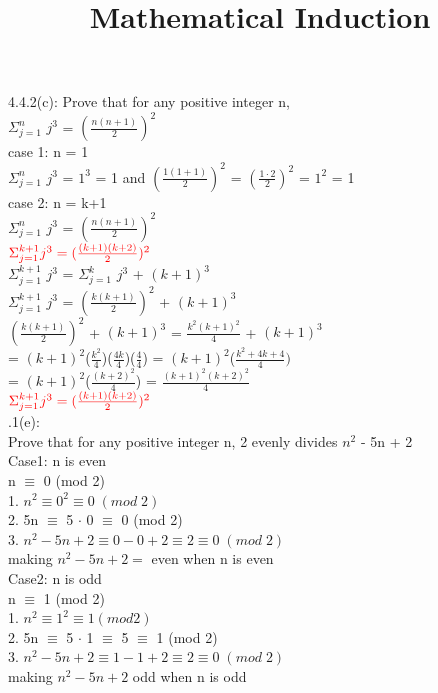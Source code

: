 \documentclass{article}
\title{Mathematical Induction}
\author{}
\date{}
\begin{document}
	4.4.2(c): 
	\newline
	Prove that for any positive integer n, \\
	$\Sigma^{n}_{j=1}$ $j^3$ = $(\frac{n(n+1)}{2})^2$ \\
	case 1: n = 1 \\
	$\Sigma^{n}_{j=1}$ $j^3$ = $1^3$ = 1
	and $(\frac{1(1+1)}{2})^2$ = $(\frac{1 \cdot 2}{2})^2$ = $1^2$ = 1 \\
	case 2: n = k+1 \\
	$\Sigma^{n}_{j=1}$ $j^3$ = $(\frac{n(n+1)}{2})^2$ \\
	$\color{red}{\Sigma^{k+1}_{j=1} j^3 = (\frac{(k+1)(k+2)}{2})^2}$ \\
	$\Sigma^{k+1}_{j=1}$ $j^3$ = $\Sigma^{k}_{j=1}$ $j^3$ + $(k+1)^3$ \\
	$\Sigma^{k+1}_{j=1}$ $j^3$ = $(\frac{k(k+1)}{2})^2$ + $(k+1)^3$ \\
	$(\frac{k(k+1)}{2})^2$ + $(k+1)^3$ =  $\frac{k^2(k+1)^2}{4}$ + $(k+1)^3$ \\
	= $(k+1)^2$($\frac{k^2}{4}$)($\frac{4k}{4}$)($\frac{4}{4}$) = $(k+1)^2$($\frac{k^2+4k+4}{4})$ \\
	= $(k+1)^2$($\frac{(k+2)^2}{4}$)
	= $\frac{(k+1)^2(k+2)^2}{4}$ \\
	$\color{red}{\Sigma^{k+1}_{j=1} j^3 = (\frac{(k+1)(k+2)}{2})^2}$ \\
	.1(e): \\
	Prove that for any positive integer n, 2 evenly divides $n^2$ - 5n + 2 \\
	Case1: n is even \\
	n $\equiv$ 0 (mod 2)  \\
	1. $n^2 \equiv 0^2 \equiv 0 \; (mod \; 2)$ \\
	2. 5n $\equiv$ 5 $\cdot$ 0 $\equiv$ 0 (mod 2) \\
	3. $n^2 -5n + 2 \equiv 0 - 0 + 2 \equiv 2 \equiv 0 \; (mod \; 2)$ \\
	making $n^2 -5n + 2=$ even when n is even \\
	\newline
	Case2: n is odd \\
	n $\equiv$ 1 (mod 2)  \\
	1. $n^2 \equiv 1^2 \equiv 1 (mod 2)$ \\
	2. 5n $\equiv$ 5 $\cdot$ 1 $\equiv$ 5  $\equiv$ 1 (mod 2) \\
	3. $n^2 -5n + 2 \equiv 1 - 1 + 2 \equiv 2 \equiv 0 \; (mod \; 2)$ \\
	making $n^2 -5n + 2$ odd when n is odd \\
\end{document}
